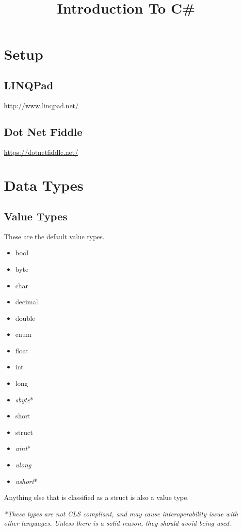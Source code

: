 \documentclass {amsart}
\title{Introduction To C\#}
\begin{document}
\maketitle


\section{Setup}
	\subsection{LINQPad}
		\url{http://www.linqpad.net/}
	\subsection{Dot Net Fiddle}
		\url{https://dotnetfiddle.net/}

\section{Data Types}
	\subsection{Value Types}  These are the default value types. 
		\begin{itemize}
			\item bool
			\item byte
			\item char
			\item decimal
			\item double
			\item enum
			\item float
			\item int
			\item long
			\item \emph{sbyte}*
			\item short
			\item struct
			\item \emph{uint}*
			\item \emph{ulong}
			\item \emph{ushort}*
		\end{itemize}
		Anything else that is classified as a struct is also a value type. \linebreak

		\emph{*These types are not CLS compliant, and may cause interoperability issue with other languages.  Unless there is a solid reason, they should avoid being used.} 
\end{document}
